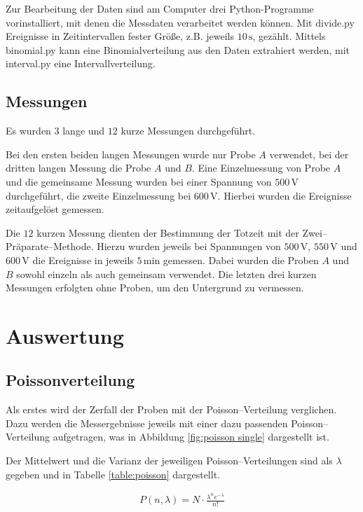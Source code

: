 \documentclass[12pt,a4paper]{scrartcl}
\numberwithin{equation}{section} %
\newcommand{\code}[1]{\textsf{#1}}
\begin{document}
Zur Bearbeitung der Daten sind am Computer drei Python-Programme vorinstalliert, mit denen die Messdaten verarbeitet werden können. Mit \code{divide.py} Ereignisse in Zeitintervallen fester Größe, z.B.  jeweils $10\mathrm{\,s}$, gezählt. Mittels \code{binomial.py} kann eine Binomialverteilung aus den Daten extrahiert werden, mit \code{interval.py} eine Intervallverteilung.

\subsection{Messungen}
Es wurden $3$ lange und $12$ kurze Messungen durchgeführt.

Bei den ersten beiden langen Messungen wurde nur Probe $A$ verwendet, bei der dritten langen Messung die Probe $A$ und $B$. Eine Einzelmessung von Probe $A$ und die gemeinsame Messung wurden bei einer Spannung von $500\mathrm{\,V}$ durchgeführt, die zweite Einzelmessung bei $600\mathrm{\,V}$. Hierbei wurden die Ereignisse zeitaufgelöst gemessen.

Die $12$ kurzen Messung dienten der Bestimmung der Totzeit mit der Zwei--Präparate--Methode. Hierzu wurden jeweils bei Spannungen von $500\mathrm{\,V}$, $550\mathrm{\,V}$ und $600\mathrm{\,V}$ die Ereignisse in jeweils $5\mathrm{\,min}$ gemessen. Dabei wurden die Proben $A$ und $B$ sowohl einzeln als auch gemeinsam verwendet. Die letzten drei kurzen Messungen erfolgten ohne Proben, um den Untergrund zu vermessen.

\clearpage
\hypertarget{auswertung}{%
\section{Auswertung}\label{auswertung}}

\hypertarget{poissonverteilung}{%
\subsection{Poissonverteilung}\label{poissonverteilung}}
Als erstes wird der Zerfall der Proben mit der Poisson--Verteilung verglichen. Dazu werden die Messergebnisse jeweils mit einer dazu passenden Poisson--Verteilung aufgetragen, was in Abbildung \ref{fig:poisson single} dargestellt ist.

Der Mittelwert und die Varianz der jeweiligen Poisson--Verteilungen sind als $\lambda$ gegeben und in Tabelle \ref{table:poisson} dargestellt.

\begin{eqnarray}
	P(n,\lambda) = N \cdot \frac{\lambda^n e^{-\lambda}}{n!}
\end{eqnarray}
\end{document}

